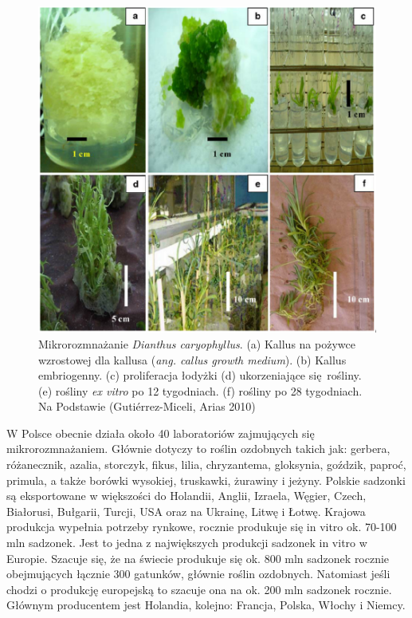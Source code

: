 \documentclass[two column, twoside, a4paper]{article}
\begin{document}
\begin{figure}[tp]
	\begin{tcolorbox}
		\centering
		\includegraphics[width=\textwidth]{./figure1.png}
		\caption{Mikrorozmnażanie \textit{Dianthus caryophyllus}. (a) Kallus na pożywce wzrostowej dla kallusa (\textit{ang. callus growth medium}). (b) Kallus embriogenny. (c) proliferacja łodyżki (d) ukorzeniające się rośliny. (e) rośliny \textit{ex vitro} po 12 tygodniach. (f) rośliny po 28 tygodniach. Na Podstawie (Gutiérrez-Miceli, Arias 2010)}
	\end{tcolorbox}
\end{figure}

W Polsce obecnie działa około 40 laboratoriów zajmujących się mikrorozmnażaniem. Głównie dotyczy to roślin ozdobnych takich jak: gerbera, różanecznik, azalia, storczyk, fikus, lilia, chryzantema, gloksynia, goździk, paproć, primula, a także borówki wysokiej, truskawki, żurawiny i jeżyny. Polskie sadzonki są eksportowane w większości do Holandii, Anglii, Izraela, Węgier, Czech, Białorusi, Bułgarii, Turcji, USA oraz na Ukrainę, Litwę i Łotwę. Krajowa produkcja wypełnia potrzeby rynkowe, rocznie produkuje się in vitro ok. 70-100 mln sadzonek. Jest to jedna z największych produkcji sadzonek in vitro w Europie. Szacuje się, że na świecie produkuje się ok. 800 mln sadzonek rocznie obejmujących łącznie 300 gatunków, głównie roślin ozdobnych. Natomiast jeśli chodzi o produkcję europejską to szacuje ona na ok. 200 mln sadzonek rocznie. Głównym producentem jest Holandia, kolejno: Francja, Polska, Włochy i Niemcy.
\end{document}
